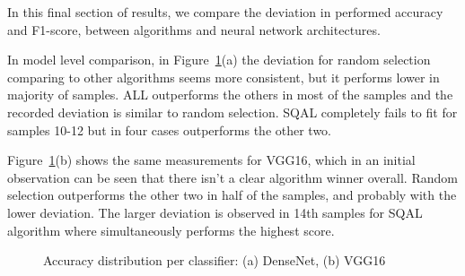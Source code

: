 In this final section of results, we compare the deviation in performed accuracy and F1-score, between algorithms and neural network architectures.

In model level comparison, in Figure~\ref{c5:figure_acc_distribution_model}(a) the deviation for random selection comparing to other algorithms seems more consistent, but it performs lower in majority of samples. ALL outperforms the others in most of the samples and the recorded deviation is similar to random selection. SQAL completely fails to fit for samples 10-12 but in four cases outperforms the other two.

Figure~\ref{c5:figure_acc_distribution_model}(b) shows the same measurements for VGG16, which in an initial observation can be seen that there isn't a clear algorithm winner overall. Random selection outperforms the other two in half of the samples, and probably with the lower deviation. The larger deviation is observed in 14th samples for SQAL algorithm where simultaneously performs the highest score.


\begin{figure}[ht!]
    \centering  
    \caption{Accuracy distribution per classifier: (a) DenseNet, (b) VGG16}
    \label{c5:figure_acc_distribution_model}
\end{figure}

